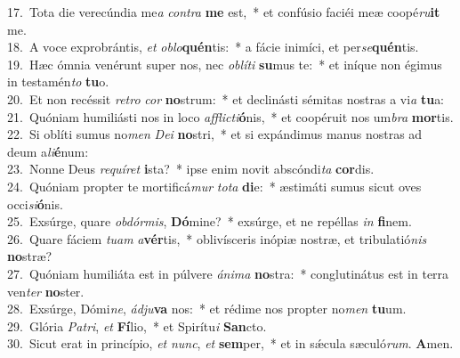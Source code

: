 {17.~}Tota die verecúndia me\textit{a} \textit{con}\textit{tra} \textbf{me} est,~* et confúsio faciéi meæ coopé\textit{ru}\textbf{it} me.\\
{18.~}A voce exprobrántis, \textit{et} \textit{o}\textit{blo}\textbf{quén}tis:~* a fácie inimíci, et per\textit{se}\textbf{quén}tis.\\
{19.~}Hæc ómnia venérunt super nos, nec \textit{o}\textit{blí}\textit{ti} \textbf{su}mus te:~* et iníque non égimus in testamén\textit{to} \textbf{tu}o.\\
{20.~}Et non recéssit \textit{re}\textit{tro} \textit{cor} \textbf{no}strum:~* et declinásti sémitas nostras a vi\textit{a} \textbf{tu}a:\\
{21.~}Quóniam humiliásti nos in loco \textit{af}\textit{fli}\textit{cti}\textbf{ó}nis,~* et coopéruit nos um\textit{bra} \textbf{mor}tis.\\
{22.~}Si oblíti sumus no\textit{men} \textit{De}\textit{i} \textbf{no}stri,~* et si expándimus manus nostras ad deum a\textit{li}\textbf{é}num:\\
{23.~}Nonne Deus \textit{re}\textit{quí}\textit{ret} \textbf{i}sta?~* ipse enim novit abscóndi\textit{ta} \textbf{cor}dis.\\
{24.~}Quóniam propter te mortificá\textit{mur} \textit{to}\textit{ta} \textbf{di}e:~* æstimáti sumus sicut oves occi\textit{si}\textbf{ó}nis.\\
{25.~}Exsúrge, quare \textit{ob}\textit{dór}\textit{mis}, \textbf{Dó}mine?~* exsúrge, et ne repéllas \textit{in} \textbf{fi}nem.\\
{26.~}Quare fáciem \textit{tu}\textit{am} \textit{a}\textbf{vér}tis,~* oblivísceris inópiæ nostræ, et tribulatió\textit{nis} \textbf{no}stræ?\\
{27.~}Quóniam humiliáta est in púlvere \textit{á}\textit{ni}\textit{ma} \textbf{no}stra:~* conglutinátus est in terra ven\textit{ter} \textbf{no}ster.\\
{28.~}Exsúrge, Dómi\textit{ne}, \textit{ád}\textit{ju}\textbf{va} nos:~* et rédime nos propter no\textit{men} \textbf{tu}um.\\
{29.~}Glória \textit{Pa}\textit{tri}, \textit{et} \textbf{Fí}lio,~* et Spirítu\textit{i} \textbf{San}cto.\\
{30.~}Sicut erat in princípio, \textit{et} \textit{nunc}, \textit{et} \textbf{sem}per,~* et in sǽcula sæculó\textit{rum}. \textbf{A}men.\\
